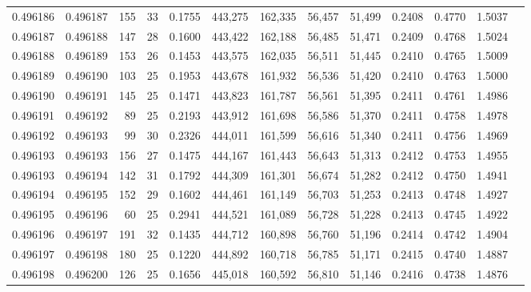 \begin{tabular}{rrrrrrrrrrrrr}
0.496186 & 0.496187 & 155 &  33 &                                     0.1755 & 443,275 & 162,335 &  56,457 &  51,499 & 0.2408 & 0.4770 & 1.5037 \\
0.496187 & 0.496188 & 147 &  28 &                                     0.1600 & 443,422 & 162,188 &  56,485 &  51,471 & 0.2409 & 0.4768 & 1.5024 \\
0.496188 & 0.496189 & 153 &  26 &                                     0.1453 & 443,575 & 162,035 &  56,511 &  51,445 & 0.2410 & 0.4765 & 1.5009 \\
0.496189 & 0.496190 & 103 &  25 &                                     0.1953 & 443,678 & 161,932 &  56,536 &  51,420 & 0.2410 & 0.4763 & 1.5000 \\
0.496190 & 0.496191 & 145 &  25 &                                     0.1471 & 443,823 & 161,787 &  56,561 &  51,395 & 0.2411 & 0.4761 & 1.4986 \\
0.496191 & 0.496192 &  89 &  25 &                                     0.2193 & 443,912 & 161,698 &  56,586 &  51,370 & 0.2411 & 0.4758 & 1.4978 \\
0.496192 & 0.496193 &  99 &  30 &                                     0.2326 & 444,011 & 161,599 &  56,616 &  51,340 & 0.2411 & 0.4756 & 1.4969 \\
0.496193 & 0.496193 & 156 &  27 &                                     0.1475 & 444,167 & 161,443 &  56,643 &  51,313 & 0.2412 & 0.4753 & 1.4955 \\
0.496193 & 0.496194 & 142 &  31 &                                     0.1792 & 444,309 & 161,301 &  56,674 &  51,282 & 0.2412 & 0.4750 & 1.4941 \\
0.496194 & 0.496195 & 152 &  29 &                                     0.1602 & 444,461 & 161,149 &  56,703 &  51,253 & 0.2413 & 0.4748 & 1.4927 \\
0.496195 & 0.496196 &  60 &  25 &                                     0.2941 & 444,521 & 161,089 &  56,728 &  51,228 & 0.2413 & 0.4745 & 1.4922 \\
0.496196 & 0.496197 & 191 &  32 &                                     0.1435 & 444,712 & 160,898 &  56,760 &  51,196 & 0.2414 & 0.4742 & 1.4904 \\
0.496197 & 0.496198 & 180 &  25 &                                     0.1220 & 444,892 & 160,718 &  56,785 &  51,171 & 0.2415 & 0.4740 & 1.4887 \\
0.496198 & 0.496200 & 126 &  25 &                                     0.1656 & 445,018 & 160,592 &  56,810 &  51,146 & 0.2416 & 0.4738 & 1.4876 \\

\end{tabular}

